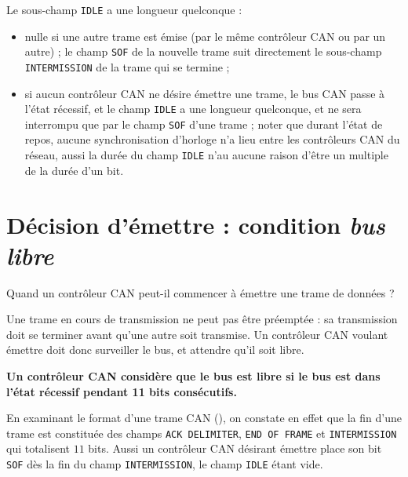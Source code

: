 Le sous-champ \texttt{IDLE} a une longueur quelconque :
\begin{itemize}
  \item nulle si une autre trame est émise (par le même contrôleur CAN ou par un autre) ; le champ \texttt{SOF} de la nouvelle trame suit directement le sous-champ \texttt{INTERMISSION} de la trame qui se termine ;
  \item si aucun contrôleur CAN ne désire émettre une trame, le bus CAN passe à l'état récessif, et le champ \texttt{IDLE} a une longueur quelconque, et ne sera interrompu que par le champ \texttt{SOF} d'une trame ; noter que durant l'état de repos, aucune synchronisation d'horloge n'a lieu entre les contrôleurs CAN du réseau, aussi la durée du champ \texttt{IDLE} n'au aucune raison d'être un multiple de la durée d'un bit.
\end{itemize}




\section{Décision d'émettre : condition \emph{bus libre}}

Quand un contrôleur CAN peut-il commencer à émettre une trame de données ?

Une trame en cours de transmission ne peut pas être préemptée : sa transmission doit se terminer avant qu'une autre soit transmise. Un contrôleur CAN voulant émettre doit donc surveiller le bus, et attendre qu'il soit libre.

{\bf Un contrôleur CAN considère que le bus est libre si le bus est dans l’état récessif pendant 11 bits consécutifs.}

En examinant le format d'une trame CAN (), on constate en effet que la fin d'une trame est constituée des champs \texttt{ACK DELIMITER}, \texttt{END OF FRAME} et \texttt{INTERMISSION} qui totalisent $11$ bits. Aussi un contrôleur CAN désirant émettre place son bit \texttt{SOF} dès la fin du champ \texttt{INTERMISSION}, le champ \texttt{IDLE} étant vide.

%

